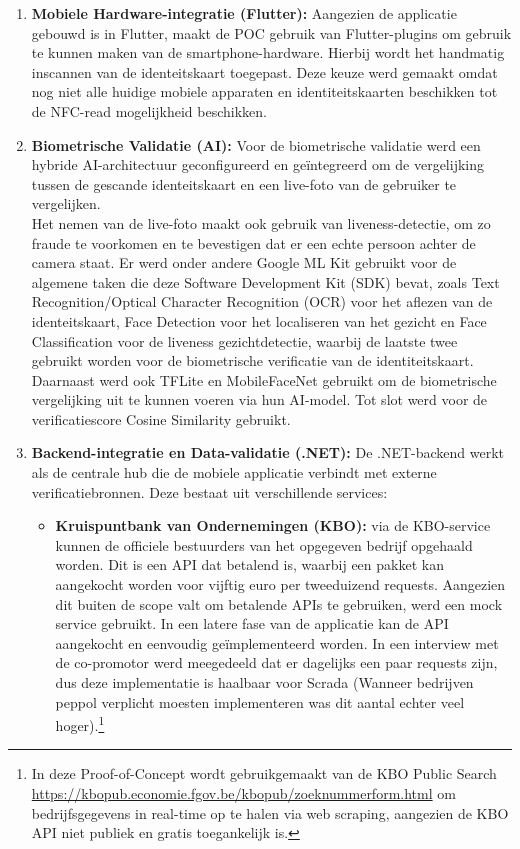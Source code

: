 \begin{enumerate}
    \item \textbf{Mobiele Hardware-integratie (Flutter):} Aangezien de applicatie gebouwd is in Flutter, maakt de POC gebruik van Flutter-plugins om gebruik te kunnen maken van de smartphone-hardware.
    Hierbij wordt het handmatig inscannen van de identeitskaart toegepast. Deze keuze werd gemaakt omdat nog niet alle huidige mobiele apparaten en identiteitskaarten beschikken tot de NFC-read mogelijkheid beschikken.
    \item \textbf{Biometrische Validatie (AI):} Voor de biometrische validatie werd een hybride AI-architectuur geconfigureerd en geïntegreerd om de vergelijking tussen de gescande identeitskaart en een live-foto van de gebruiker te vergelijken. \\ Het nemen van de live-foto
    maakt ook gebruik van liveness-detectie, om zo fraude te voorkomen en te bevestigen dat er een echte persoon achter de camera staat. Er werd onder andere Google ML Kit gebruikt voor de algemene taken die deze Software Development Kit (SDK) bevat, zoals Text Recognition/Optical Character Recognition (OCR)
    voor het aflezen van de identeitskaart, Face Detection voor het localiseren van het gezicht en Face Classification voor  de liveness gezichtdetectie, waarbij de laatste twee gebruikt worden voor de biometrische verificatie van de identiteitskaart. Daarnaast werd ook TFLite en MobileFaceNet gebruikt om de
    biometrische vergelijking uit te kunnen voeren via hun AI-model. Tot slot werd voor de verificatiescore Cosine Similarity gebruikt.
    \item \textbf{Backend-integratie en Data-validatie (.NET):}
    De .NET-backend werkt als de centrale hub die de mobiele applicatie verbindt met externe verificatiebronnen. Deze bestaat uit verschillende services:
        \begin{itemize}
        \item \textbf{Kruispuntbank van Ondernemingen (KBO):} via de KBO-service kunnen de officiele bestuurders van het opgegeven bedrijf opgehaald worden. Dit is een API dat betalend is, waarbij een pakket kan aangekocht worden voor vijftig euro per tweeduizend requests. Aangezien dit buiten de scope valt om 
        betalende APIs te gebruiken, werd een mock service gebruikt. In een latere fase van de applicatie kan de API aangekocht en eenvoudig geïmplementeerd worden. In een interview met de co-promotor werd meegedeeld dat er dagelijks een paar requests zijn, dus deze implementatie is haalbaar
        voor Scrada (Wanneer bedrijven peppol verplicht moesten implementeren was dit aantal echter veel hoger).\footnote{In deze Proof-of-Concept wordt gebruikgemaakt van de KBO Public Search \url{https://kbopub.economie.fgov.be/kbopub/zoeknummerform.html} om bedrijfsgegevens in real-time op te halen via web scraping, aangezien de KBO API niet publiek en gratis toegankelijk is. 
}
\end{itemize}
\end{enumerate}
